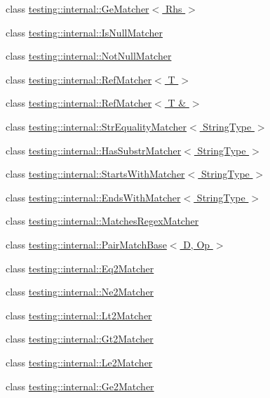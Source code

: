 \begin{DoxyCompactItemize}
\item 
class \hyperlink{classtesting_1_1internal_1_1GeMatcher}{testing\+::internal\+::\+Ge\+Matcher$<$ Rhs $>$}
\item 
class \hyperlink{classtesting_1_1internal_1_1IsNullMatcher}{testing\+::internal\+::\+Is\+Null\+Matcher}
\item 
class \hyperlink{classtesting_1_1internal_1_1NotNullMatcher}{testing\+::internal\+::\+Not\+Null\+Matcher}
\item 
class \hyperlink{classtesting_1_1internal_1_1RefMatcher}{testing\+::internal\+::\+Ref\+Matcher$<$ T $>$}
\item 
class \hyperlink{classtesting_1_1internal_1_1RefMatcher_3_01T_01_6_01_4}{testing\+::internal\+::\+Ref\+Matcher$<$ T \& $>$}
\item 
class \hyperlink{classtesting_1_1internal_1_1StrEqualityMatcher}{testing\+::internal\+::\+Str\+Equality\+Matcher$<$ String\+Type $>$}
\item 
class \hyperlink{classtesting_1_1internal_1_1HasSubstrMatcher}{testing\+::internal\+::\+Has\+Substr\+Matcher$<$ String\+Type $>$}
\item 
class \hyperlink{classtesting_1_1internal_1_1StartsWithMatcher}{testing\+::internal\+::\+Starts\+With\+Matcher$<$ String\+Type $>$}
\item 
class \hyperlink{classtesting_1_1internal_1_1EndsWithMatcher}{testing\+::internal\+::\+Ends\+With\+Matcher$<$ String\+Type $>$}
\item 
class \hyperlink{classtesting_1_1internal_1_1MatchesRegexMatcher}{testing\+::internal\+::\+Matches\+Regex\+Matcher}
\item 
class \hyperlink{classtesting_1_1internal_1_1PairMatchBase}{testing\+::internal\+::\+Pair\+Match\+Base$<$ D, Op $>$}
\item 
class \hyperlink{classtesting_1_1internal_1_1Eq2Matcher}{testing\+::internal\+::\+Eq2\+Matcher}
\item 
class \hyperlink{classtesting_1_1internal_1_1Ne2Matcher}{testing\+::internal\+::\+Ne2\+Matcher}
\item 
class \hyperlink{classtesting_1_1internal_1_1Lt2Matcher}{testing\+::internal\+::\+Lt2\+Matcher}
\item 
class \hyperlink{classtesting_1_1internal_1_1Gt2Matcher}{testing\+::internal\+::\+Gt2\+Matcher}
\item 
class \hyperlink{classtesting_1_1internal_1_1Le2Matcher}{testing\+::internal\+::\+Le2\+Matcher}
\item 
class \hyperlink{classtesting_1_1internal_1_1Ge2Matcher}{testing\+::internal\+::\+Ge2\+Matcher}

\end{DoxyCompactItemize}
